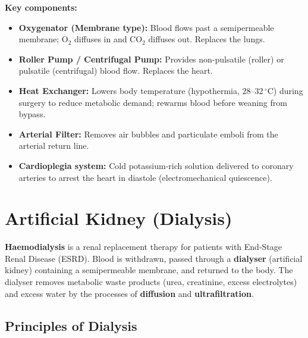 \documentclass[12pt,a4paper]{article}
\begin{document}
\textbf{Key components:}
\begin{itemize}[leftmargin=*, itemsep=3pt]
  \item \textbf{Oxygenator (Membrane type):} Blood flows past a semipermeable membrane; O$_2$ diffuses in and CO$_2$ diffuses out. Replaces the lungs.
  \item \textbf{Roller Pump / Centrifugal Pump:} Provides non-pulsatile (roller) or pulsatile (centrifugal) blood flow. Replaces the heart.
  \item \textbf{Heat Exchanger:} Lowers body temperature (hypothermia, $28$--$32\,^{\circ}$C) during surgery to reduce metabolic demand; rewarms blood before weaning from bypass.
  \item \textbf{Arterial Filter:} Removes air bubbles and particulate emboli from the arterial return line.
  \item \textbf{Cardioplegia system:} Cold potassium-rich solution delivered to coronary arteries to arrest the heart in diastole (electromechanical quiescence).
\end{itemize}

\section{Artificial Kidney (Dialysis)}

\begin{tcolorbox}[defbox, title={\textbf{Haemodialysis (Artificial Kidney)}}]
\textbf{Haemodialysis} is a renal replacement therapy for patients with End-Stage Renal Disease (ESRD). Blood is withdrawn, passed through a \textbf{dialyser} (artificial kidney) containing a semipermeable membrane, and returned to the body. The dialyser removes metabolic waste products (urea, creatinine, excess electrolytes) and excess water by the processes of \textbf{diffusion} and \textbf{ultrafiltration}.
\end{tcolorbox}

\subsection{Principles of Dialysis}
\end{document}
